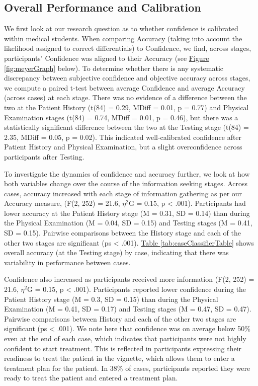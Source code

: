 \documentclass[a4paper, nobind]{templates/ociamthesis}
\begin{document}
\subsection{Overall Performance and Calibration}\label{overall-performance-and-calibration}

We first look at our research question as to whether confidence is calibrated within medical students. When comparing Accuracy (taking into account the likelihood assigned to correct differentials) to Confidence, we find, across stages, participants' Confidence was aligned to their Accuracy (see \hyperref[fig:meyerGraph]{Figure \ref{fig:meyerGraph}} below). To determine whether there is any systematic discrepancy between subjective confidence and objective accuracy across stages, we compute a paired t-test between average Confidence and average Accuracy (across cases) at each stage. There was no evidence of a difference between the two at the Patient History (t(84) = 0.29, MDiff = 0.01, p = 0.77) and Physical Examination stages (t(84) = 0.74, MDiff = 0.01, p = 0.46), but there was a statistically significant difference between the two at the Testing stage (t(84) = 2.35, MDiff = 0.05, p = 0.02). This indicated well-calibrated confidence after Patient History and Physical Examination, but a slight overconfidence across participants after Testing.

\hfill\break
To investigate the dynamics of confidence and accuracy further, we look at how both variables change over the course of the information seeking stages. Across cases, accuracy increased with each stage of information gathering as per our Accuracy measure, (F(2, 252) = 21.6, \(\eta^2\)G = 0.15, p \textless{} .001). Participants had lower accuracy at the Patient History stage (M = 0.31, SD = 0.14) than during the Physical Examination (M = 0.04, SD = 0.15) and Testing stages (M = 0.41, SD = 0.15). Pairwise comparisons between the History stage and each of the other two stages are significant (ps \textless{} .001). \hyperref[tab:caseClassifierTable]{Table \ref{tab:caseClassifierTable}} shows overall accuracy (at the Testing stage) by case, indicating that there was variability in performance between cases.

\hfill\break
Confidence also increased as participants received more information (F(2, 252) = 21.6, \(\eta^2\)G = 0.15, p \textless{} .001). Participants reported lower confidence during the Patient History stage (M = 0.3, SD = 0.15) than during the Physical Examination (M = 0.41, SD = 0.17) and Testing stages (M = 0.47, SD = 0.47). Pairwise comparisons between History and each of the other two stages are significant (ps \textless{} .001). We note here that confidence was on average below 50\% even at the end of each case, which indicates that participants were not highly confident to start treatment. This is reflected in participants expressing their readiness to treat the patient in the vignette, which allows them to enter a treatment plan for the patient. In 38\% of cases, participants reported they were ready to treat the patient and entered a treatment plan.
\end{document}
